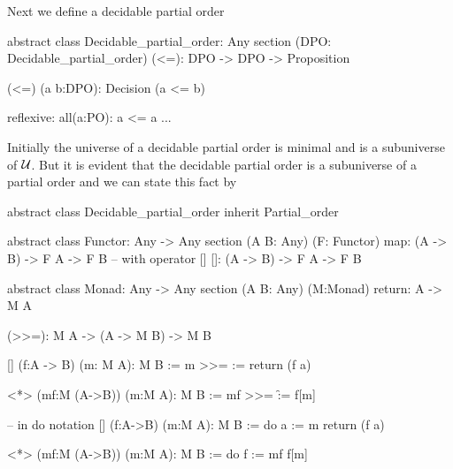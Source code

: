 Next we define a decidable partial order
%
\begin{alba}
  abstract class
    Decidable_partial_order: Any
  section (DPO: Decidable_partial_order)
    (<=): DPO -> DPO -> Proposition

    (<=) (a b:DPO): Decision (a <= b)

    reflexive: all(a:PO): a <= a
    ...
\end{alba}
%
Initially the universe of a decidable partial order is minimal and is a
subuniverse of ${\cal{U}}$. But it is evident that the decidable partial order is a
subuniverse of a partial order and we can state this fact by
%
\begin{alba}
  abstract class Decidable_partial_order inherit Partial_order
\end{alba}



\begin{alba}
  abstract class
    Functor: Any -> Any
  section (A B: Any) (F: Functor)
    map: (A -> B) -> F A  -> F B
    -- with operator []
    []:  (A -> B) -> F A  -> F B
\end{alba}


\begin{alba}
  abstract
    class Monad: Any -> Any
  section (A B: Any) (M:Monad)
    return: A -> M A

    (>>=): M A  -> (A -> M B) -> M B

    [] (f:A -> B) (m: M A): M B :=
      m >>= \a := return  (f a)

    <*> (mf:M (A->B)) (m:M A): M B :=
      mf >>= \f  := f[m]

    -- in do notation
    [] (f:A->B) (m:M A): M B :=
      do
        a := m
        return  (f a)

    <*> (mf:M (A->B)) (m:M A): M B :=
      do
        f := mf
        f[m]
\end{alba}








